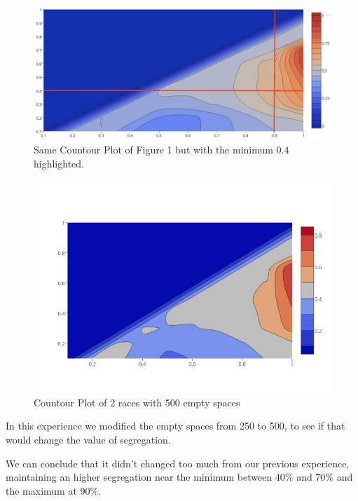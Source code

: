 \documentclass[a4paper,titlepage,11pt]{article}
\begin{document}
\begin{figure}[!h]
    \centering
    \includegraphics[scale=0.40]{img/ploty-a.png}
    \caption{Same Countour Plot of Figure 1 but with the minimum $0.4$ highlighted.}
\end{figure}

\newpage

\begin{figure}[!h]
    \centering
    \includegraphics[scale=0.50]{img/500emptyspaces.png}
    \caption{Countour Plot of 2 races with 500 empty spaces}
\end{figure}

In this experience we modified the empty spaces from 250 to 500, to see if that would change the value of segregation. 

We can conclude that it didn't changed too much from our previous experience, maintaining an higher segregation near the minimum between 40\% and 70\% and the maximum at 90\%.

\newpage
\end{document}
